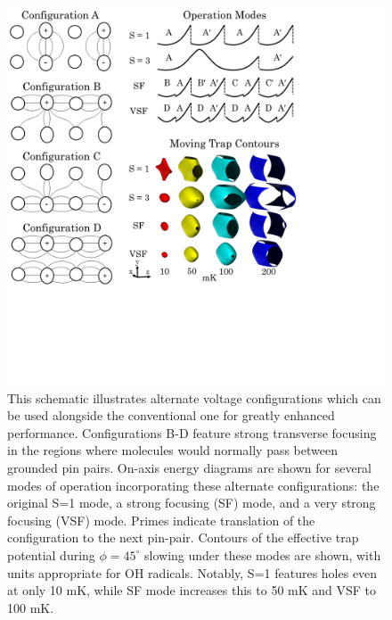 \documentclass[%
 reprint,
 amsmath,amssymb,
 aps,
pra,
]{revtex4-1}
\begin{document}
\begin{figure}[t]
\includegraphics[width=\linewidth]{chargecartoon.png}%
\caption{
This schematic illustrates alternate voltage configurations which can be used alongside the conventional one for greatly enhanced performance. Configurations B-D feature strong transverse focusing in the regions where molecules would normally pass between grounded pin pairs. On-axis energy diagrams are shown for several modes of operation incorporating these alternate configurations: the original S=1 mode, a strong focusing (SF) mode, and a very strong focusing (VSF) mode. Primes indicate translation of the configuration to the next pin-pair. Contours of the effective trap potential during $\phi=45^\circ$ slowing under these modes are shown, with units appropriate for OH radicals. Notably, S=1 features  holes even at only 10 mK, while SF mode increases this to 50 mK and VSF to 100 mK. 
}
\label{fig:speedvary}
\end{figure}
\end{document}
